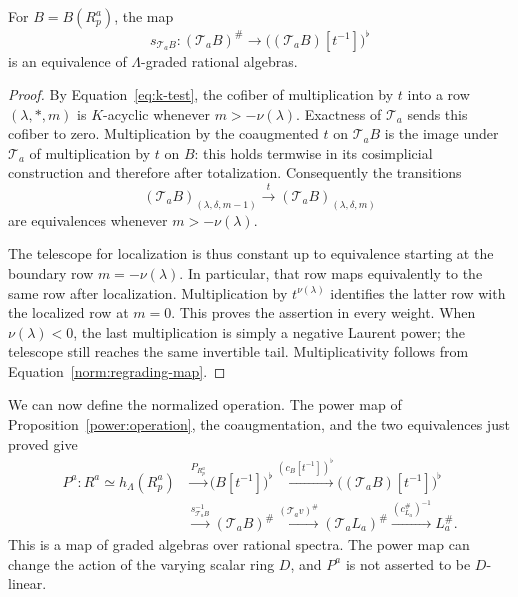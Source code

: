 \begin{lemma}
\label{norm:normalization}
For $B=B(R_p^a)$, the map
\[
 s_{\mathcal T_a B}:
 (\mathcal T_a B)^\#\longrightarrow
 \bigl((\mathcal T_a B)[t^{-1}]\bigr)^\flat
\]
is an equivalence of $\Lambda$-graded rational algebras.
\end{lemma}

\begin{proof}
By Equation~\eqref{eq:k-test}, the cofiber of multiplication by $t$
into a row $(\lambda,*,m)$ is $K$-acyclic whenever
$m> -\nu(\lambda)$.  Exactness of $\mathcal T_a$ sends this
cofiber to zero.  Multiplication by the coaugmented $t$ on
$\mathcal T_a B$ is the image under $\mathcal T_a$ of multiplication
by $t$ on $B$: this holds termwise in its cosimplicial construction
and therefore after totalization.  Consequently the transitions
\[
 (\mathcal T_a B)_{(\lambda,\delta,m-1)}
   \xrightarrow{t}
 (\mathcal T_a B)_{(\lambda,\delta,m)}
\]
are equivalences whenever $m> -\nu(\lambda)$.

The telescope for localization is thus constant up to equivalence
starting at the boundary row $m=-\nu(\lambda)$.  In particular,
that row maps equivalently to the same row after localization.
Multiplication by $t^{\nu(\lambda)}$ identifies the latter row
with the localized row at $m=0$.  This proves the assertion in every
weight.  When $\nu(\lambda)<0$, the last multiplication is simply
a negative Laurent power; the telescope still reaches the same
invertible tail.  Multiplicativity follows from
Equation~\eqref{norm:regrading-map}.
\end{proof}

We can now define the normalized operation.  The power map of
Proposition~\ref{power:operation}, the coaugmentation, and the two
equivalences just proved give
\begin{equation}
\label{norm:normalized-operation}
\begin{aligned}
 P^a:R^a\simeq h_\Lambda(R_p^a)
 &\xrightarrow{P_{R_p^a}}\bigl(B[t^{-1}]\bigr)^\flat
 \xrightarrow{(c_B[t^{-1}])^\flat}
       \bigl((\mathcal T_a B)[t^{-1}]\bigr)^\flat\\
 &\xrightarrow{s_{\mathcal T_a B}^{-1}}
       (\mathcal T_a B)^\#
 \xrightarrow{(\mathcal T_a v)^\#}
       (\mathcal T_a L_a)^\#
 \xrightarrow{(c_{L_a}^\#)^{-1}} L_a^\#.
\end{aligned}
\end{equation}
This is a map of graded algebras over rational spectra.  The power
map can change the action of the varying scalar ring $D$, and
$P^a$ is not asserted to be $D$-linear.

